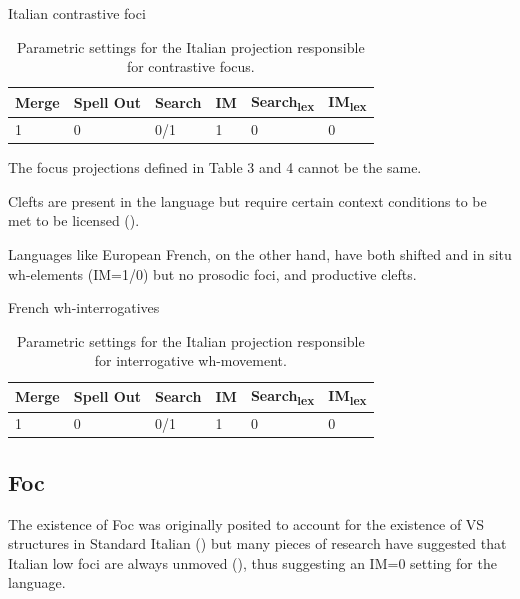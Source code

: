 \documentclass[fleqn,10pt]{wlscirep}
\begin{document}
\begin{exe}
    \ex Italian contrastive foci
\end{exe}

\begin{table}[H]
    \centering
    \begin{tabular}{|l|l|l|l|l|l|}
    \hline
    Merge & Spell Out & Search & IM & Search\textsubscript{lex} & IM\textsubscript{lex} \\
    \hline
    1 & 0 & 0/1 & 1 & 0 & 0 \\
    \hline
    \end{tabular}
    \caption{\label{tab:samp}Parametric settings for the Italian projection responsible for contrastive focus.}
\end{table}

\noindent The focus projections defined in Table 3 and 4 cannot be the same.

\noindent Clefts are present in the language but require certain context conditions to be met to be licensed (\citealt{larrive2022}). 

\noindent Languages like European French, on the other hand, have both shifted and in situ wh-elements (IM=1/0) but no prosodic foci, and productive clefts. 

\begin{exe}
    \ex French wh-interrogatives
\end{exe}

\begin{table}[H]
    \centering
    \begin{tabular}{|l|l|l|l|l|l|}
    \hline
    Merge & Spell Out & Search & IM & Search\textsubscript{lex} & IM\textsubscript{lex} \\
    \hline
    1 & 0 & 0/1 & 1 & 0 & 0 \\
    \hline
    \end{tabular}
    \caption{\label{tab:samp}Parametric settings for the Italian projection responsible for interrogative wh-movement.}
\end{table}

\subsection*{Foc}

The existence of Foc was originally posited to account for the existence of VS structures in Standard Italian (\citealt{belletti2004}) but many pieces of research have suggested that Italian low foci are always unmoved (\citealt{cardinaletti2001,sameklodovici15,bonan21}), thus suggesting an IM=0 setting for the language. 
\end{document}
